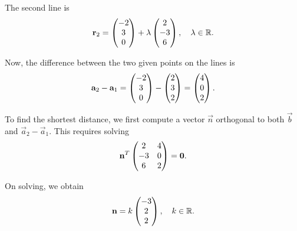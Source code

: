 \documentclass[12pt]{article}
\begin{document}
The second line is
\begin{align}
    \mathbf{r}_2 = \begin{pmatrix}-2 \\ 3 \\ 0\end{pmatrix} + \lambda \begin{pmatrix}2 \\ -3 \\ 6\end{pmatrix}, \quad \lambda \in \mathbb{R}.
\end{align}

Now, the difference between the two given points on the lines is
\begin{align}
    \mathbf{a}_2 - \mathbf{a}_1 
    = \begin{pmatrix}-2 \\ 3 \\ 0\end{pmatrix} - \begin{pmatrix}2 \\ 3 \\ 2\end{pmatrix} 
    = \begin{pmatrix}4 \\ 0 \\ 2\end{pmatrix}.
\end{align}

To find the shortest distance, we first compute a vector $\vec{n}$ orthogonal to both $\vec{b}$ and $\vec{a}_2 - \vec{a}_1$.  
This requires solving
\begin{align}
    \mathbf{n}^T 
    \begin{pmatrix}
        2 & 4 \\
       -3 & 0 \\
        6 & 2
    \end{pmatrix} = \mathbf{0}.
\end{align}

On solving, we obtain
\begin{align}
    \mathbf{n} = k \begin{pmatrix}-3 \\ 2 \\ 2\end{pmatrix}, \quad k \in \mathbb{R}.
\end{align}
\end{document}

